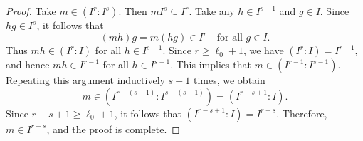 \documentclass[10pt,a4paper]{amsart}
\begin{document}
\begin{proof}
Take  $m \in (I^r : I^s)$. Then $m I^s \subseteq I^r$. Take any $h \in I^{s-1}$ and $g \in I$. Since $hg \in I^s$, it follows that
\[
(mh)g = m(hg) \in I^r \quad \text{for all } g \in I.
\]
Thus $mh \in (I^r : I)$ for all $h \in I^{s-1}$. Since $r \geq \ell_0 + 1$, we have
$(I^r : I) = I^{r-1},$
and hence $mh \in I^{r-1}$ for all $h \in I^{s-1}$. This implies that
  $m \in (I^{r-1} : I^{s-1}).$
Repeating this argument inductively $s-1$ times, we obtain
\[
m \in (I^{r-(s-1)} : I^{s-(s-1)}) = (I^{r-s+1} : I).
\]
Since $r - s + 1 \geq \ell_0 + 1$, it follows that $(I^{r-s+1} : I) = I^{r-s}.$ 
Therefore, $m \in I^{r-s}$, and the proof is complete.
\end{proof}
\end{document}
